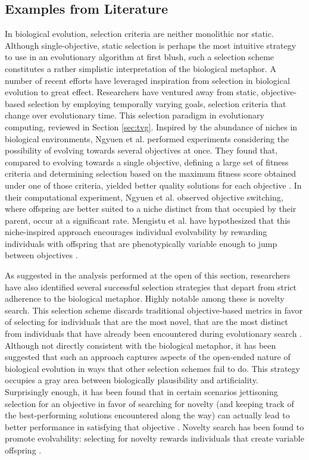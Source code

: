 \subsection{Examples from Literature}
In biological evolution, selection criteria are neither monolithic nor static.
Although single-objective, static selection is perhaps the most intuitive strategy to use in an evolutionary algorithm at first blush, such a selection scheme constitutes a rather simplistic interpretation of the biological metaphor.
A number of recent efforts have leveraged inspiration from selection in biological evolution to great effect.
Researchers have ventured away from static, objective-based selection by employing temporally varying goals, selection criteria that change over evolutionary time.
This selection paradigm in evolutionary computing, reviewed in Section \ref{sec:tvg}.
Inspired by the abundance of niches in biological environments, Ngyuen et al. performed experiments considering the possibility of evolving towards several objectives at once.
They found that, compared to evolving towards a single objective, defining a large set of fitness criteria and determining selection based on the maximum fitness score obtained under one of those criteria, yielded better quality solutions for each objective \cite{Nguyen2015InnovationLearning}.
In their computational experiment, Ngyuen et al. observed objective switching, where offspring are better suited to a niche distinct from that occupied by their parent, occur at a significant rate.
Mengistu et al. have hypothesized that this niche-inspired approach encourages individual evolvability by rewarding individuals with offspring that are  phenotypically variable enough to jump between objectives \cite{Mengistu2016EvolvabilityIt}.

As suggested in the analysis performed at the open of this section, researchers have also identified several successful selection strategies that depart from strict adherence to the biological metaphor.
Highly notable among these is novelty search.
This selection scheme discards traditional objective-based metrics in favor of selecting for individuals that are the most novel, that are the most distinct from individuals that have already been encountered during evolutionary search \cite{Lehman2008ExploitingNovelty}.
Although not directly consistent with the biological metaphor, it has been suggested that such an approach captures aspects of the open-ended nature of biological evolution in ways that other selection schemes fail to do.
This strategy occupies a gray area between biologically plausibility and artificiality.
Surprisingly enough, it has been found that in certain scenarios jettisoning selection for an objective in favor of searching for novelty (and keeping track of the best-performing solutions encountered along the way) can actually lead to better performance in satisfying that objective \cite{Lehman2008ExploitingNovelty}.
Novelty search has been found to promote evolvability: selecting for novelty rewards individuals that create variable offspring \cite{Lehman2011ImprovingSelf-Adaptation}.

